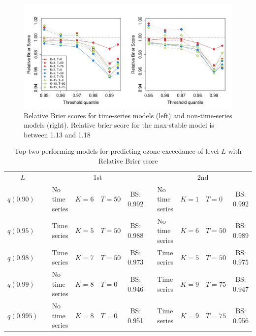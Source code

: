 \begin{figure}
  \includegraphics[width=\linewidth]{plots/bs-ozone.pdf}
  \caption{Relative Brier scores for time-series models (left) and non-time-series models (right). Relative brier score for the max-stable model is between 1.13 and 1.18}
  \label{stfig:bs-ozone}
\end{figure}
\begin{table}
  \footnotesize
  \caption{Top two performing models for predicting ozone exceedance of level $L$ with Relative Brier score}
  \label{sttbl:ozoneresults}
  \centering
  \begin{tabular}{l c l l l c c l l l c}
    \toprule
     \multicolumn{1}{c}{$L$} &\phantom{ab} & \multicolumn{4}{c}{1st} & \phantom{a} & \multicolumn{4}{c}{2nd} \\
    \cmidrule{1-1} \cmidrule{3-6} \cmidrule{8-11}
    $q(0.90)$  && No time series & $K=6$  & $T=50$  & BS: 0.992 &&
                 No time series & $K=1$  & $T=0$  & BS: 0.992 \\
    $q(0.95)$  && Time series & $K=5$ & $T=50$ & BS: 0.988 &&
                 No time series & $K=6$  & $T=50$ & BS: 0.989\\
    $q(0.98)$  && Time series & $K=7$  & $T=50$ & BS: 0.973 &&
                 Time series & $K=5$ & $T=50$ & BS: 0.975\\
    $q(0.99)$  && No time series    & $K=8$ & $T=0$ & BS: 0.946 &&
                 Time series    & $K=9$  & $T=75$ & BS: 0.947\\
    $q(0.995)$ && No time series    & $K=8$  & $T=0$ & BS: 0.951 &&
                 Time series    & $K=9$ & $T=75$ & BS: 0.956\\
    \bottomrule
  \end{tabular}
\end{table}


